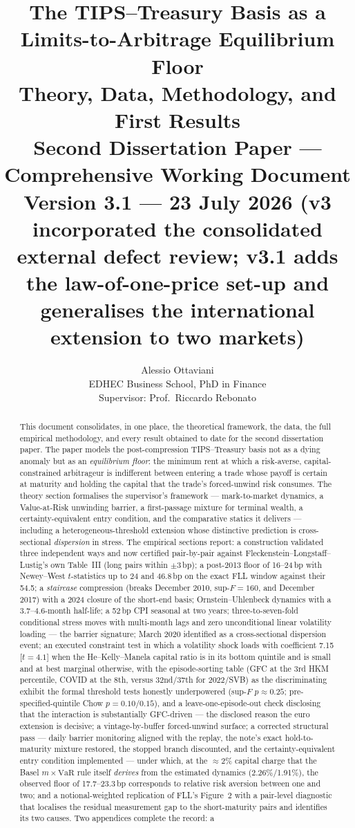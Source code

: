 \documentclass[11pt]{article}
\title{\textbf{The TIPS--Treasury Basis as a Limits-to-Arbitrage Equilibrium Floor}\\[5pt] \large Theory, Data, Methodology, and First Results\\ \normalsize Second Dissertation Paper --- Comprehensive Working Document\\[3pt] \small Version 3.1 --- 23 July 2026 (v3 incorporated the consolidated external defect review; v3.1 adds the law-of-one-price set-up and generalises the international extension to two markets)}
\author{Alessio Ottaviani\\ EDHEC Business School, PhD in Finance\\[4pt] \small Supervisor: Prof.\ Riccardo Rebonato}
\date{}
\newcommand{\VaR}{\mathrm{VaR}}
\begin{document}
\maketitle

\begin{abstract}
\noindent This document consolidates, in one place, the theoretical framework, the data, the full empirical methodology, and every result obtained to date for the second dissertation paper. The paper models the post-compression TIPS--Treasury basis not as a dying anomaly but as an \emph{equilibrium floor}: the minimum rent at which a risk-averse, capital-constrained arbitrageur is indifferent between entering a trade whose payoff is certain at maturity and holding the capital that the trade's forced-unwind risk consumes. The theory section formalises the supervisor's framework --- mark-to-market dynamics, a Value-at-Risk unwinding barrier, a first-passage mixture for terminal wealth, a certainty-equivalent entry condition, and the comparative statics it delivers --- including a heterogeneous-threshold extension whose distinctive prediction is cross-sectional \emph{dispersion} in stress. The empirical sections report: a construction validated three independent ways and now certified pair-by-pair against Fleckenstein--Longstaff--Lustig's own Table~III (long pairs within $\pm3$\,bp); a post-2013 floor of 16--24\,bp with Newey--West $t$-statistics up to 24 and 46.8\,bp on the exact FLL window against their 54.5; a \emph{staircase} compression (breaks December 2010, sup-$F=160$, and December 2017) with a 2024 closure of the short-end basis; Ornstein--Uhlenbeck dynamics with a 3.7--4.6-month half-life; a 52\,bp CPI seasonal at two years; three-to-seven-fold conditional stress moves with multi-month lags and zero unconditional linear volatility loading --- the barrier signature; March 2020 identified as a cross-sectional dispersion event; an executed constraint test in which a volatility shock loads with coefficient 7.15 [$t=4.1$] when the He--Kelly--Manela capital ratio is in its bottom quintile and is small and at best marginal otherwise, with the episode-sorting table (GFC at the 3rd HKM percentile, COVID at the 8th, versus 32nd/37th for 2022/SVB) as the discriminating exhibit the formal threshold tests honestly underpowered (sup-$F$ $p\approx0.25$; pre-specified-quintile Chow $p=0.10$/$0.15$), and a leave-one-episode-out check disclosing that the interaction is substantially GFC-driven --- the disclosed reason the euro extension is decisive; a vintage-by-buffer forced-unwind surface; a corrected structural pass --- daily barrier monitoring aligned with the replay, the note's exact hold-to-maturity mixture restored, the stopped branch discounted, and the certainty-equivalent entry condition implemented --- under which, at the $\approx$2\% capital charge that the Basel $m\times\VaR$ rule itself \emph{derives} from the estimated dynamics (2.26\%/1.91\%), the observed floor of 17.7--23.3\,bp corresponds to relative risk aversion between one and two; and a notional-weighted replication of FLL's Figure~2 with a pair-level diagnostic that localises the residual measurement gap to the short-maturity pairs and identifies its two causes. Two appendices complete the record: a 
\end{abstract}
\end{document}
